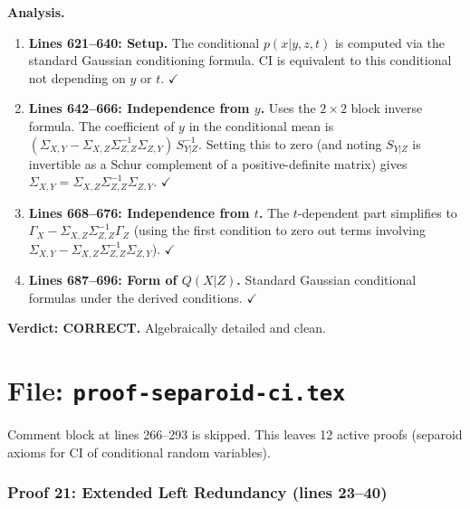 \documentclass{article}
\begin{document}
\textbf{Analysis.}
\begin{enumerate}[leftmargin=*]
  \item \textbf{Lines 621--640: Setup.}
    The conditional $p(x|y,z,t)$ is computed via the standard Gaussian
    conditioning formula.  CI is equivalent to this conditional not depending
    on $y$ or $t$.  $\checkmark$

  \item \textbf{Lines 642--666: Independence from $y$.}
    Uses the $2\times2$ block inverse formula.  The coefficient of $y$ in
    the conditional mean is
    $(\Sigma_{X,Y}-\Sigma_{X,Z}\Sigma_{Z,Z}^{-1}\Sigma_{Z,Y})\,S_{Y|Z}^{-1}$.
    Setting this to zero (and noting $S_{Y|Z}$ is invertible as a Schur
    complement of a positive-definite matrix) gives
    $\Sigma_{X,Y}=\Sigma_{X,Z}\Sigma_{Z,Z}^{-1}\Sigma_{Z,Y}$.  $\checkmark$

  \item \textbf{Lines 668--676: Independence from $t$.}
    The $t$-dependent part simplifies to
    $\Gamma_X-\Sigma_{X,Z}\Sigma_{Z,Z}^{-1}\Gamma_Z$
    (using the first condition to zero out terms involving
    $\Sigma_{X,Y}-\Sigma_{X,Z}\Sigma_{Z,Z}^{-1}\Sigma_{Z,Y}$).  $\checkmark$

  \item \textbf{Lines 687--696: Form of $Q(X|Z)$.}
    Standard Gaussian conditional formulas under the derived conditions.  $\checkmark$
\end{enumerate}

\textbf{Verdict: CORRECT.}  Algebraically detailed and clean.


\part*{File: \texttt{proof-separoid-ci.tex}}

Comment block at lines 266--293 is skipped.
This leaves 12 active proofs (separoid axioms for CI of conditional random variables).

\section{Proof 21: Extended Left Redundancy (lines 23--40)}
\end{document}
